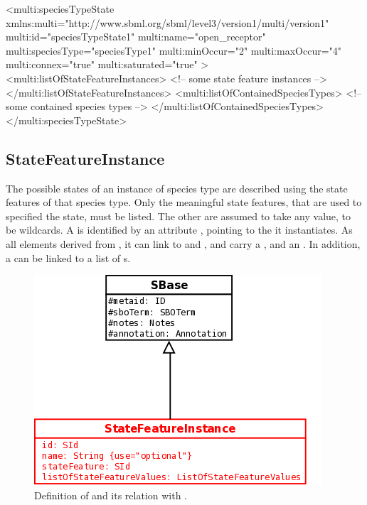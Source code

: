 \begin{example}
<multi:speciesTypeState 
                    xmlns:multi="http://www.sbml.org/sbml/level3/version1/multi/version1" 
                    multi:id="speciesTypeState1" multi:name="open_receptor"
                    multi:speciesType="speciesType1"
                    multi:minOccur="2" multi:maxOccur="4"
                    multi:connex="true" multi:saturated="true" >
  <multi:listOfStateFeatureInstances>
    <!-- some state feature instances -->
  </multi:listOfStateFeatureInstances>
  <multi:listOfContainedSpeciesTypes>
    <!-- some contained species types -->
  </multi:listOfContainedSpeciesTypes>
</multi:speciesTypeState>
\end{example}

\subsection{StateFeatureInstance}

The possible states of an instance of species type are described using the state features of that species type. Only the meaningful state features, that are used to specified the state, must be listed. The other are assumed to take any value, to be wildcards. A   is identified by an attribute , pointing to the  it instantiates. As all elements derived from , it can link to  and , and carry a , and an . In addition, a  can be linked to a list of s.

\begin{figure}[H]
\begin{center}
\includegraphics[scale=0.5]{figs/pngs/StateFeatureInstanceClass.png} 
\caption{Definition of  and its relation with .}
\label{fig:StateFeatureInstanceClass}
\end{center}
\end{figure}

